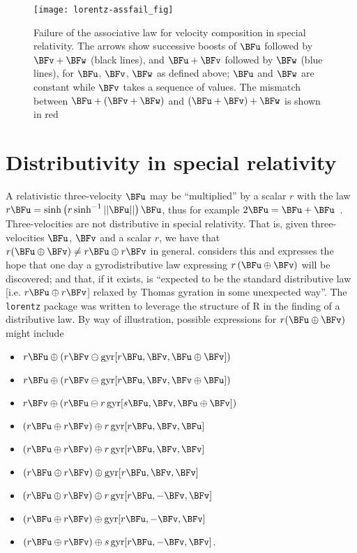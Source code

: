 \documentclass[ijoc,nonblindrev]{informs3} %
\begin{document}
\begin{figure}[htbp]
  \begin{center}
\texttt{[image: lorentz-assfail\_fig]}
\caption{Failure of the associative law \label{assfail} for velocity
  composition in special relativity.  The arrows show successive
  boosts of $\BFu$ followed by $\BFv+\BFw$ (black lines), and $\BFu+\BFv$
  followed by $\BFw$ (blue lines), for $\BFu$, $\BFv$, $\BFw$ as defined
  above; $\BFu$ and $\BFw$ are constant while $\BFv$ takes a sequence of
  values. The mismatch between $\BFu+\left(\BFv+\BFw\right)$ and
  $\left(\BFu+\BFv\right)+\BFw$ is shown in red}
  \end{center}
\end{figure}


\section{Distributivity in special relativity}

A relativistic three-velocity $\BFu$ may be ``multiplied'' by a scalar
$r$ with the law
$r\BFu=\sinh\left(r\sinh^{-1}\left|\left|\BFu\right|\right|\right)\BFu$,
thus for example $2\BFu=\BFu+\BFu$~\citep{ungar1997}.
Three-velocities are not distributive in special relativity.  That is,
given three-velocities $\BFu$, $\BFv$ and a scalar $r$, we have that
$r(\BFu\oplus\BFv)\neq r\BFu\oplus r\BFv$ in general.
\cite{ungar1997} considers this and expresses the hope that one day a
gyrodistributive law expressing $r\left(\BFu\oplus\BFv\right)$ will be
discovered; and that, if it exists, is ``expected to be the standard
distributive law [i.e. $r\BFu\oplus r\BFv$] relaxed by Thomas gyration
in some unexpected way''.  The {\tt lorentz} package was written to
leverage the structure of R in the finding of a distributive law.  By
way of illustration, possible expressions for $r(\BFu\oplus\BFv)$ might
include

\begin{itemize}
\item $r\BFu  \oplus (r\BFv  \ominus \operatorname{gyr}[r\BFu, \BFv,\BFu\oplus\BFv])$
\item $r\BFu  \oplus (r\BFv  \ominus \operatorname{gyr}[r\BFu, \BFv,\BFv\oplus\BFu])$
\item $r\BFv  \oplus (r\BFu  \ominus r\operatorname{gyr}[s\BFu, \BFv,\BFu\oplus\BFv])$
\item $(r\BFu \oplus r\BFv)  \oplus r\operatorname{gyr}[r\BFu, \BFv,\BFu]$
\item $(r\BFu \oplus r\BFv)  \oplus r\operatorname{gyr}[r\BFu, \BFv,\BFv]$
\item $(r\BFu \oplus r\BFv)  \oplus \operatorname{gyr}[r\BFu, \BFv,\BFv]$
\item $(r\BFu \oplus r\BFv)  \oplus r\operatorname{gyr}[r\BFu,-\BFv,\BFv]$
\item $(r\BFu \oplus r\BFv)  \oplus   \operatorname{gyr}[r\BFu,-\BFv,\BFv]$
\item $(r\BFu \oplus r\BFv)  \oplus s\operatorname{gyr}[r\BFu,-\BFv,\BFv]$.
\end{itemize}
\end{document}
